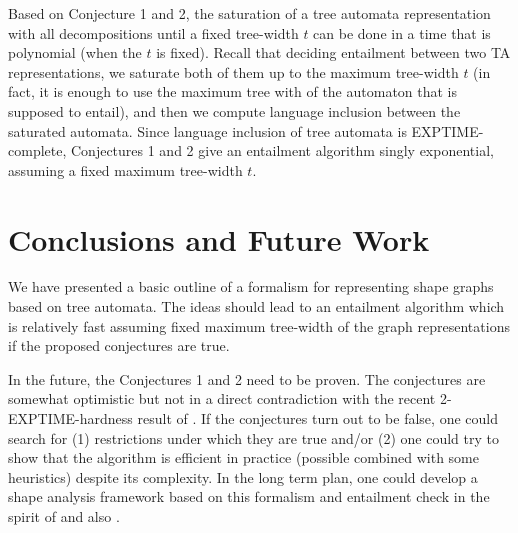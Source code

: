 {Based on Conjecture 1 and 2, the saturation of a tree automata representation with all decompositions until a fixed tree-width $t$ can be done in a time that is polynomial (when the $t$ is fixed).
%
Recall that deciding entailment between two TA representations, we saturate both of them up to the maximum tree-width $t$ (in fact, it is enough to use the maximum tree with of the automaton that is supposed to entail),
and then we compute language inclusion between the saturated automata.
%
Since language inclusion of tree automata is EXPTIME-complete, Conjectures 1 and 2 give an entailment algorithm singly exponential, assuming a fixed maximum tree-width $t$.

\section{Conclusions and Future Work}
We have presented a basic outline of a formalism for representing shape graphs based on tree automata. The ideas should lead to an entailment algorithm which is relatively fast assuming fixed maximum tree-width of the graph representations if the proposed conjectures are true.

In the future, the Conjectures 1 and 2 need to be proven. The conjectures are somewhat optimistic but not in a direct contradiction with the recent 2-EXPTIME-hardness result of \cite{Iosif:LPAR}. If the conjectures turn out to be false, one could search for (1) restrictions under which they are true and/or (2) one could try to show that the algorithm is efficient in practice (possible
combined with some heuristics) despite its complexity.
In the long term plan, one could develop a shape analysis framework based on this formalism and entailment check in the spirit of \cite{holik_boxes_2013} and also \cite{locle:secondorder}.

%
%



}
